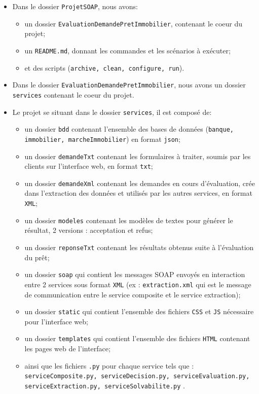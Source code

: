 \documentclass{article}
\begin{document}
    \begin{itemize}
    \item Dans le dossier \texttt{ProjetSOAP}, nous avons:
    \begin{itemize}
        \item un dossier \texttt{EvaluationDemandePretImmobilier}, contenant le coeur du projet;
        \item un \texttt{README.md}, donnant les commandes et les scénarios à exécuter;
        \item et des scripts (\texttt{archive, clean, configure, run}).
    \end{itemize}  
    
    \item Dans le dossier \texttt{EvaluationDemandePretImmobilier},  nous avons un dossier \texttt{services} contenant le coeur du projet. 
    
    \item Le projet se situant dans le dossier \texttt{services}, il est composé de:
    \begin{itemize}
      \item un dossier \texttt{bdd} contenant l'ensemble des bases de données (\texttt{banque, immobilier, marcheImmobilier}) en format \texttt{json};
      \item un dossier \texttt{demandeTxt} contenant les formulaires à traiter, soumis par les clients sur l'interface web, en format \texttt{txt};
      \item un dossier \texttt{demandeXml} contenant les demandes en cours d'évaluation, crée dans l'extraction des données et utilisés par les autres services, en format \texttt{XML};
      \item un dossier \texttt{modeles} contenant les modèles de textes pour générer le résultat, 2 versions : acceptation et refus;
      \item un dossier \texttt{reponseTxt} contenant les résultats obtenus suite à l'évaluation du prêt;
      \item un dossier \texttt{soap} qui contient les messages SOAP envoyés en interaction entre 2 services sous format \texttt{XML} (ex : \texttt{extraction.xml} qui est le message de communication entre le service composite et le service extraction);
      \item un dossier \texttt{static} qui contient l'ensemble des fichiers \texttt{CSS} et \texttt{JS} nécessaire pour l'interface web;
      \item un dossier \texttt{templates} qui contient l'ensemble des fichiers \texttt{HTML} contenant les pages web de l'interface;
      \item ainsi que les fichiers \texttt{.py} pour chaque service tels que : \texttt{serviceComposite.py, serviceDecision.py, serviceEvaluation.py, serviceExtraction.py, serviceSolvabilite.py} .
    \end{itemize}
    
    \end{itemize}
    
\end{document}
